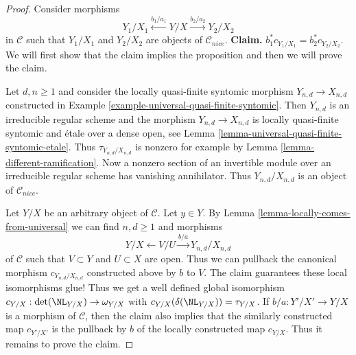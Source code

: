\begin{proof}
\medskip\noindent
Consider morphisms
$$
Y_1/X_1 \xleftarrow{b_1/a_1} Y/X \xrightarrow{b_2/a_2} Y_2/X_2
$$
in $\mathcal{C}$ such that $Y_1/X_1$ and $Y_2/X_2$ are objects
of $\mathcal{C}_{nice}$. {\bf Claim.} $b_1^*c_{Y_1/X_1} = b_2^*c_{Y_2/X_2}$.
We will first show that the claim implies the proposition
and then we will prove the claim.

\medskip\noindent
Let $d, n \geq 1$ and consider the locally
quasi-finite syntomic morphism $Y_{n, d} \to X_{n, d}$
constructed in Example \ref{example-universal-quasi-finite-syntomic}.
Then $Y_{n, d}$ is an irreducible regular scheme and the
morphism $Y_{n, d} \to X_{n, d}$ is locally quasi-finite syntomic
and \'etale over a dense open, see
Lemma \ref{lemma-universal-quasi-finite-syntomic-etale}.
Thus $\tau_{Y_{n, d}/X_{n, d}}$ is nonzero for example by
Lemma \ref{lemma-different-ramification}. Now a nonzero section
of an invertible module over an irreducible regular scheme
has vanishing annihilator. Thus
$Y_{n, d}/X_{n, d}$ is an object of $\mathcal{C}_{nice}$.

\medskip\noindent
Let $Y/X$ be an arbitrary object of $\mathcal{C}$. Let $y \in Y$.
By Lemma \ref{lemma-locally-comes-from-universal} we can find
$n, d \geq 1$ and morphisms
$$
Y/X \leftarrow V/U \xrightarrow{b/a} Y_{n, d}/X_{n, d}
$$
of $\mathcal{C}$ such that $V \subset Y$ and $U \subset X$ are open.
Thus we can pullback the canonical morphism $c_{Y_{n, d}/X_{n, d}}$
constructed above by $b$ to $V$. The claim guarantees these local
isomorphisms glue! Thus we get a well defined global isomorphism
$c_{Y/X} : \det(\NL_{Y/X}) \to \omega_{Y/X}$ with
$c_{Y/X}(\delta(\NL_{Y/X})) = \tau_{Y/X}$.
If $b/a : Y'/X' \to Y/X$ is a morphism of $\mathcal{C}$, then
the claim also implies that the similarly constructed map
$c_{Y'/X'}$ is the pullback by $b$ of the locally constructed
map $c_{Y/X}$. Thus it remains to prove the claim.


\end{proof}
